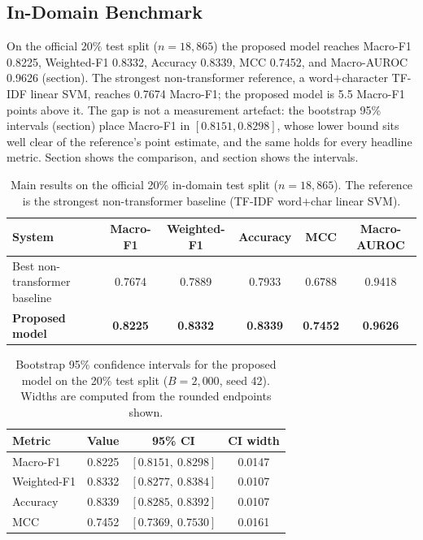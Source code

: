 \documentclass[11pt,a4paper]{article}
\def\Cref#1{Section}%
\def\cref#1{section}%
\begin{document}
\subsection{In-Domain Benchmark}
\label{sec:main-results}

On the official 20\% test split ($n = 18{,}865$) the proposed model reaches Macro-F1 0.8225, Weighted-F1 0.8332, Accuracy 0.8339, MCC 0.7452, and Macro-AUROC 0.9626 (\cref{tab:main}). The strongest non-transformer reference, a word$+$character TF-IDF linear SVM, reaches 0.7674 Macro-F1; the proposed model is 5.5 Macro-F1 points above it. The gap is not a measurement artefact: the bootstrap 95\% intervals (\cref{tab:ci}) place Macro-F1 in $[0.8151, 0.8298]$, whose lower bound sits well clear of the reference's point estimate, and the same holds for every headline metric. \Cref{fig:main} shows the comparison, and \cref{fig:ci} shows the intervals.

\begin{table}[!htbp]
\centering
\caption{Main results on the official 20\% in-domain test split ($n = 18{,}865$). The reference is the strongest non-transformer baseline (TF-IDF word$+$char linear SVM).}
\label{tab:main}
\small
\begin{tabular}{@{}lccccc@{}}
\toprule
\textbf{System} & \textbf{Macro-F1} & \textbf{Weighted-F1} & \textbf{Accuracy} & \textbf{MCC} & \textbf{Macro-AUROC} \\
\midrule
Best non-transformer baseline & 0.7674 & 0.7889 & 0.7933 & 0.6788 & 0.9418 \\
\textbf{Proposed model} & \textbf{0.8225} & \textbf{0.8332} & \textbf{0.8339} & \textbf{0.7452} & \textbf{0.9626} \\
\bottomrule
\end{tabular}
\end{table}

\begin{table}[!htbp]
\centering
\caption{Bootstrap 95\% confidence intervals for the proposed model on the 20\% test split ($B = 2{,}000$, seed 42). Widths are computed from the rounded endpoints shown.}
\label{tab:ci}
\small
\begin{tabular}{@{}lccc@{}}
\toprule
\textbf{Metric} & \textbf{Value} & \textbf{95\% CI} & \textbf{CI width} \\
\midrule
Macro-F1 & 0.8225 & $[0.8151,\ 0.8298]$ & 0.0147 \\
Weighted-F1 & 0.8332 & $[0.8277,\ 0.8384]$ & 0.0107 \\
Accuracy & 0.8339 & $[0.8285,\ 0.8392]$ & 0.0107 \\
MCC & 0.7452 & $[0.7369,\ 0.7530]$ & 0.0161 \\
\bottomrule
\end{tabular}
\end{table}
\end{document}
